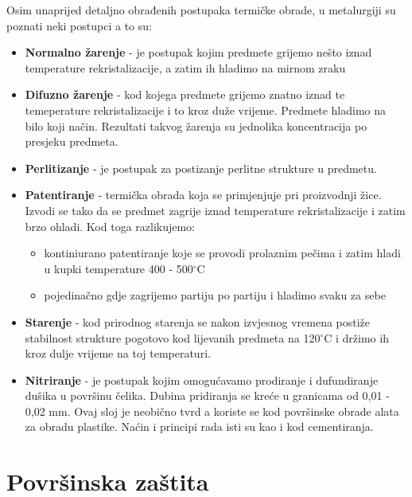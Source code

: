 \documentclass[a4paper,12pt]{article}
\numberwithin{figure}{section}
\begin{document}
Osim unaprijed detaljno obrađenih postupaka termičke obrade, u metalurgiji su poznati neki postupci a to su:
\begin{itemize}
\item \textbf{Normalno žarenje} - je postupak kojim predmete grijemo nešto iznad temperature rekristalizacije, a zatim ih hladimo na mirnom zraku
\item \textbf{Difuzno žarenje} - kod kojega predmete grijemo znatno iznad te temeperature rekristalizacije i to kroz duže vrijeme. Predmete hladimo na bilo koji način. Rezultati takvog žarenja su jednolika koncentracija po presjeku predmeta.
\item \textbf{Perlitizanje} - je postupak za postizanje perlitne strukture u predmetu.
\item \textbf{Patentiranje} - termička obrada koja se primjenjuje pri proizvodnji žice. Izvodi se tako da se predmet zagrije iznad temperature rekristalizacije i zatim brzo ohladi. Kod toga razlikujemo:
\begin{itemize}
\item kontiniurano patentiranje koje se provodi prolaznim pečima i zatim hladi u kupki temperature 400 - 500$^{\circ}$C
\item pojedinačno gdje zagrijemo partiju po partiju i hladimo svaku za sebe
\end{itemize}
\item \textbf{Starenje} - kod prirodnog starenja se nakon izvjesnog vremena postiže stabilnost strukture pogotovo kod lijevanih predmeta na 120$^{\circ}$C i držimo ih kroz dulje vrijeme na toj temperaturi.
\item \textbf{Nitriranje} - je postupak kojim omogućavamo prodiranje i dufundiranje dušika u površinu čelika. Dubina pridiranja se kreće u granicama od 0,01 - 0,02 mm. Ovaj sloj je neobično tvrd a koriste se kod površinske obrade alata za obradu plastike. Naćin i principi rada isti su kao i kod cementiranja.
\end{itemize}
\section{Površinska zaštita}
\end{document}
